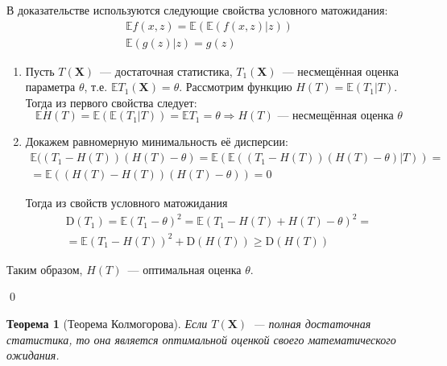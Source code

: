 \documentclass[oneside,final,14pt]{extreport}
\renewenvironment{proof}{{\bfseries Доказательство.}}{\qed}
\newtheorem{thm}{Теорема}[section]
\theoremstyle{definition}
\begin{document}
\begin{proof}
В доказательстве используются следующие свойства условного матожидания: 
\begin{gather*}
    \mathbb{E} f(x, z)=\mathbb{E}(\mathbb{E}(f(x, z) | z)) \\
    \mathbb{E}(g(z) | z)=g(z)
\end{gather*}

\begin{enumerate}
    \item Пусть $T(\mathbf{X})$~--- достаточная статистика, $T_1(\mathbf{X})$~--- несмещённая оценка параметра $\theta$, т.е. $\mathbb{E} T_{1}(\mathbf{X})=\theta$. Рассмотрим функцию $H(T)=\mathbb{E}\left(T_{1} | T\right)$. Тогда из первого свойства следует:
    \begin{equation*}
        \mathbb{E} H(T)=\mathbb{E}\left(\mathbb{E}\left(T_{1} |     T\right)\right)=\mathbb{E} T_{1}=\theta \Rightarrow H(T)     \text{~--- несмещённая оценка~} \theta
    \end{equation*}

    \item Докажем равномерную минимальность её дисперсии:
    \begin{multline*}
        \mathbb{E}((T_{1}-H(T))(H(T)-\theta)
        = \mathbb{E}(\mathbb{E}((T_{1}-H(T))(H(T)-\theta) | T)) 
        = \\
        = \mathbb{E}((H(T)-H(T))(H(T)-\theta))
        = 0
    \end{multline*}

    Тогда из свойств условного матожидания
    \begin{multline*}
        \mathrm{D}\left(T_{1}\right) 
        = \mathbb{E}\left(T_{1}-\theta\right)^{2}=\mathbb{E}\left(T_{1}-H(T)+H(T)-\theta\right)^{2} =\\
        = \mathbb{E}\left(T_{1}-H(T)\right)^{2}+\mathrm{D}(H(T)) \geqslant \mathrm{D}(H(T))
    \end{multline*}
\end{enumerate}
Таким образом, $H(T)$~--- оптимальная оценка $\theta$.

\end{proof}

\begin{thm}[Теорема Колмогорова]
Если $T(\mathbf{X})$~--- полная достаточная статистика, то она является оптимальной оценкой своего математического ожидания.
\end{thm}
\end{document}
